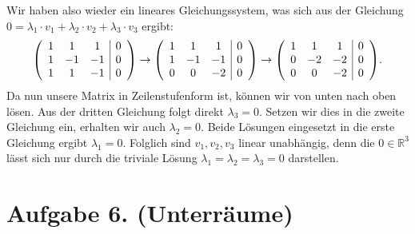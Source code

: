 \documentclass[german,12pt]{homework}
\newcommand{\RR}{\mathbb{R}}
\DeclarePairedDelimiter{\enbrace}{(}{)}
\begin{document}
\begin{enumerate}
        Wir haben also wieder ein lineares Gleichungssystem, was sich aus der
        Gleichung \(0 = \lambda_1 \cdot v_1 + \lambda_2 \cdot v_2 + \lambda_3
        \cdot v_3\) ergibt:
        \[\enbrace*{\begin{array}{ccc|c}
            1 & 1 & 1 & 0\\
            1 & -1 & -1 & 0\\
            1 & 1 & -1 & 0
        \end{array}} \to \enbrace*{\begin{array}{ccc|c}
            1 & 1 & 1 & 0\\
            1 & -1 & -1 & 0\\
            0 & 0 & -2 & 0
        \end{array}} \to \enbrace*{\begin{array}{ccc|c}
            1 & 1 & 1 & 0\\
            0 & -2 & -2 & 0\\
            0 & 0 & -2 & 0
        \end{array}}.\]
        Da nun unsere Matrix in Zeilenstufenform ist, können wir von unten nach
        oben lösen. Aus der dritten Gleichung folgt direkt \(\lambda_3 = 0\).
        Setzen wir dies in die zweite Gleichung ein, erhalten wir auch
        \(\lambda_2 = 0\). Beide Lösungen eingesetzt in die erste Gleichung
        ergibt \(\lambda_1 = 0\). Folglich sind \(v_1, v_2, v_3\) linear
        unabhängig, denn die \(0 \in \RR^3\) lässt sich nur durch die triviale
        Lösung \(\lambda_1 = \lambda_2 = \lambda_3 = 0\) darstellen.
    \end{enumerate}

    \section*{Aufgabe 6. (Unterräume)}
\end{document}
